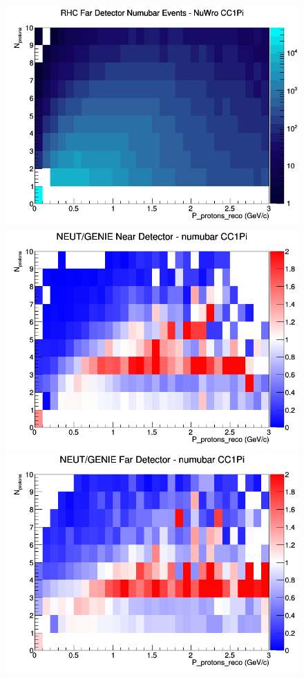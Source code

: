 \begin{figure}[h]
\endminipage
{}
\includegraphics[width=\linewidth]{eff_N_P/GAr/protons/CC1Pi_RHC_FD_numubar_N_P_NuWro.png}
\endminipage
\newline
{}
\includegraphics[width=\linewidth]{eff_N_P/GAr/protons/ratios/CC1Pi_NEUT_GENIE_numubar_near_N_P.png}
\endminipage
{}
\includegraphics[width=\linewidth]{eff_N_P/GAr/protons/ratios/CC1Pi_NEUT_GENIE_numubar_far_N_P.png}

\end{figure}
